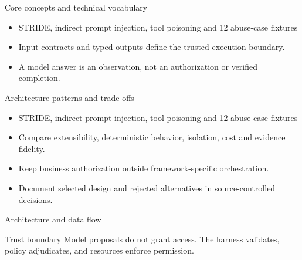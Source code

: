 \documentclass[aspectratio=169,10pt]{beamer}
\begin{document}
\begin{frame}{Core concepts and technical vocabulary}
\small
\begin{itemize}
\item STRIDE, indirect prompt injection, tool poisoning and 12 abuse-case fixtures
\item Input contracts and typed outputs define the trusted execution boundary.
\item A model answer is an observation, not an authorization or verified completion.
\end{itemize}

\end{frame}

\begin{frame}{Architecture patterns and trade-offs}
\small
\begin{itemize}
\item STRIDE, indirect prompt injection, tool poisoning and 12 abuse-case fixtures
\item Compare extensibility, deterministic behavior, isolation, cost and evidence fidelity.
\item Keep business authorization outside framework-specific orchestration.
\item Document selected design and rejected alternatives in source-controlled decisions.
\end{itemize}

\end{frame}

\begin{frame}{Architecture and data flow}
\small
\centering
{}
\vspace{0.6cm}
\begin{block}{Trust boundary}
Model proposals do not grant access. The harness validates, policy adjudicates, and resources enforce permission.
\end{block}
\end{frame}
\end{document}
